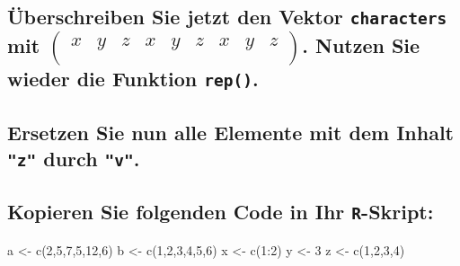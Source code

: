 \documentclass[12pt,a4paper]{article}
\newenvironment{Shaded}{\begin{snugshade}}{\end{snugshade}}
\newcommand{\DecValTok}[1]{\textcolor[rgb]{0.00,0.00,0.81}{#1}}
\newcommand{\FunctionTok}[1]{\textcolor[rgb]{0.00,0.00,0.00}{#1}}
\newcommand{\NormalTok}[1]{#1}
\newcommand{\OtherTok}[1]{\textcolor[rgb]{0.56,0.35,0.01}{#1}}
\newcommand{\SpecialCharTok}[1]{\textcolor[rgb]{0.00,0.00,0.00}{#1}}
\begin{document}
\hypertarget{uxfcberschreiben-sie-jetzt-den-vektor-mit-beginpmatrix-x-y-z-x-y-z-x-y-z-endpmatrix.-nutzen-sie-wieder-die-funktion-.}{%
\subsection{\texorpdfstring{Überschreiben Sie jetzt den Vektor
\texttt{characters} mit
\linebreak  \(\begin{pmatrix} x & y & z & x & y & z & x & y & z \\ \end{pmatrix}\).
Nutzen Sie wieder die Funktion
\texttt{rep()}.}{Überschreiben Sie jetzt den Vektor  mit \textbackslash begin\{pmatrix\} x \& y \& z \& x \& y \& z \& x \& y \& z \textbackslash\textbackslash{} \textbackslash end\{pmatrix\}. Nutzen Sie wieder die Funktion .}}\label{uxfcberschreiben-sie-jetzt-den-vektor-mit-beginpmatrix-x-y-z-x-y-z-x-y-z-endpmatrix.-nutzen-sie-wieder-die-funktion-.}}

\hypertarget{ersetzen-sie-nun-alle-elemente-mit-dem-inhalt-durch-.}{%
\subsection{\texorpdfstring{Ersetzen Sie nun alle Elemente mit dem
Inhalt \texttt{"z"} durch
\texttt{"v"}.}{Ersetzen Sie nun alle Elemente mit dem Inhalt  durch .}}\label{ersetzen-sie-nun-alle-elemente-mit-dem-inhalt-durch-.}}

\hypertarget{kopieren-sie-folgenden-code-in-ihr--skript}{%
\subsection{\texorpdfstring{Kopieren Sie folgenden Code in Ihr
\texttt{R}-Skript:}{Kopieren Sie folgenden Code in Ihr -Skript:}}\label{kopieren-sie-folgenden-code-in-ihr--skript}}

\begin{Shaded}
\begin{Highlighting}[]
\NormalTok{    a }\OtherTok{\textless{}{-}} \FunctionTok{c}\NormalTok{(}\DecValTok{2}\NormalTok{,}\DecValTok{5}\NormalTok{,}\DecValTok{7}\NormalTok{,}\DecValTok{5}\NormalTok{,}\DecValTok{12}\NormalTok{,}\DecValTok{6}\NormalTok{)}
\NormalTok{    b }\OtherTok{\textless{}{-}} \FunctionTok{c}\NormalTok{(}\DecValTok{1}\NormalTok{,}\DecValTok{2}\NormalTok{,}\DecValTok{3}\NormalTok{,}\DecValTok{4}\NormalTok{,}\DecValTok{5}\NormalTok{,}\DecValTok{6}\NormalTok{)}
\NormalTok{    x }\OtherTok{\textless{}{-}} \FunctionTok{c}\NormalTok{(}\DecValTok{1}\SpecialCharTok{:}\DecValTok{2}\NormalTok{)}
\NormalTok{    y }\OtherTok{\textless{}{-}} \DecValTok{3}
\NormalTok{    z }\OtherTok{\textless{}{-}} \FunctionTok{c}\NormalTok{(}\DecValTok{1}\NormalTok{,}\DecValTok{2}\NormalTok{,}\DecValTok{3}\NormalTok{,}\DecValTok{4}\NormalTok{)}
\end{Highlighting}
\end{Shaded}
\end{document}
